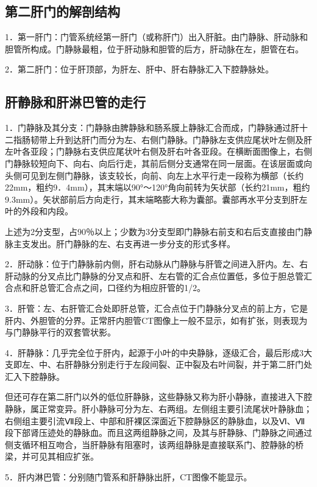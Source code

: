 \subsection{第二肝门的解剖结构}

1．第一肝门：门管系统经第一肝门（或称肝门）出入肝脏。由门静脉、肝动脉和胆管所构成。门静脉最粗，位于肝动脉和胆管的后方，肝动脉在左，胆管在右。

2．第二肝门：位于肝顶部，为肝左、肝中、肝右静脉汇入下腔静脉处。

\subsection{肝静脉和肝淋巴管的走行}

1．门静脉及其分支：门静脉由脾静脉和肠系膜上静脉汇合而成，门静脉通过肝十二指肠韧带上升到达肝门而分为左、右侧门静脉。门静脉左支供应尾状叶左侧及肝左叶各亚段；门静脉右支供应尾状叶右侧及肝右叶各亚段。在横断面图像上，右侧门静脉较短向下、向右、向后行走，其前后侧分支通常在同一层面。在该层面或向头侧可见到左侧门静脉，该支较长，向前、向左上水平行走一段称为横部（长约22mm，粗约9．4mm），其末端以90°～120°角向前转为矢状部（长约21mm，粗约9.3mm）。矢状部前后方向走行，其末端略膨大称为囊部。囊部再水平分支到肝左叶的外段和内段。

上述为2分支型，占90％以上；少数为3分支型即门静脉右前支和右后支直接由门静脉主支发出。肝门静脉的左、右支再进一步分支的形式多样。

2．肝动脉：位于门静脉前内侧，肝右动脉从门静脉与肝管之间进入肝内。左、右肝动脉的分叉点比门静脉的分叉点和肝、左右管的汇合点位置低，多位于胆总管汇合点和肝总管汇合点之间，口径约为相应肝管的1/2。

3．肝管：左、右肝管汇合处即肝总管，汇合点位于门静脉分叉点的前上方，它是肝内、外胆管的分界。正常肝内胆管CT图像上一般不显示，如有扩张，则表现为与门静脉平行的双套管状影。

4．肝静脉：几乎完全位于肝内，起源于小叶的中央静脉，逐级汇合，最后形成3大支即左、中、右肝静脉分别走行于左段间裂、正中裂及右叶间裂，并于第二肝门处汇入下腔静脉。

但还可存在第二肝门以外的低位肝静脉，这些静脉又称为肝小静脉，直接进入下腔静脉，属正常变异。肝小静脉可分为左、右两组。左侧组主要引流尾状叶静脉血；右侧组主要引流Ⅶ段上、中部和肝裸区深面近下腔静脉区的静脉血，以及Ⅵ、Ⅶ段下部肾压迹处的静脉血。而且这两组静脉之间，及其与肝静脉、门静脉之间通过侧支循环相互吻合，当肝静脉有阻塞时，该两组静脉是直接联系门、腔静脉的桥梁，并可见其相应扩张。

5．肝内淋巴管：分别随门管系和肝静脉出肝，CT图像不能显示。

